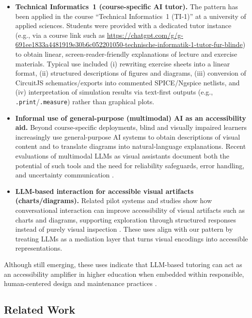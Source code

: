 \begin{itemize}
    \item \textbf{Technical Informatics~1 (course-specific AI tutor).}
    The pattern has been applied in the course ``Technical Informatics~1 (TI-1)'' at a university of applied sciences. Students were provided with a dedicated tutor instance (e.g., via a course link such as \url{https://chatgpt.com/g/g-691ee1833a4481919e30b6c052201050-technische-informatik-1-tutor-fur-blinde}) to obtain linear, screen-reader-friendly explanations of lecture and exercise materials. Typical use included (i) rewriting exercise sheets into a linear format, (ii) structured descriptions of figures and diagrams, (iii) conversion of CircuitJS schematics/exports into commented SPICE/Ngspice netlists, and (iv) interpretation of simulation results via text-first outputs (e.g., \texttt{.print}/\texttt{.measure}) rather than graphical plots.

    \item \textbf{Informal use of general-purpose (multimodal) AI as an accessibility aid.}
    Beyond course-specific deployments, blind and visually impaired learners increasingly use general-purpose AI systems to obtain descriptions of visual content and to translate diagrams into natural-language explanations. Recent evaluations of multimodal LLMs as visual assistants document both the potential of such tools and the need for reliability safeguards, error handling, and uncertainty communication \cite{Karamolegkou2025}.

    \item \textbf{LLM-based interaction for accessible visual artifacts (charts/diagrams).}
    Related pilot systems and studies show how conversational interaction can improve accessibility of visual artifacts such as charts and diagrams, supporting exploration through structured responses instead of purely visual inspection \cite{Gorniak2024VizAbility,Sharif2025VoxEx}. These uses align with our pattern by treating LLMs as a mediation layer that turns visual encodings into accessible representations.
\end{itemize}

Although still emerging, these uses indicate that LLM-based tutoring can act as an accessibility amplifier in higher education when embedded within responsible, human-centered design and maintenance practices \cite{shneiderman2020,ieee2019,lazar2015}.

\subsection*{Related Work}

